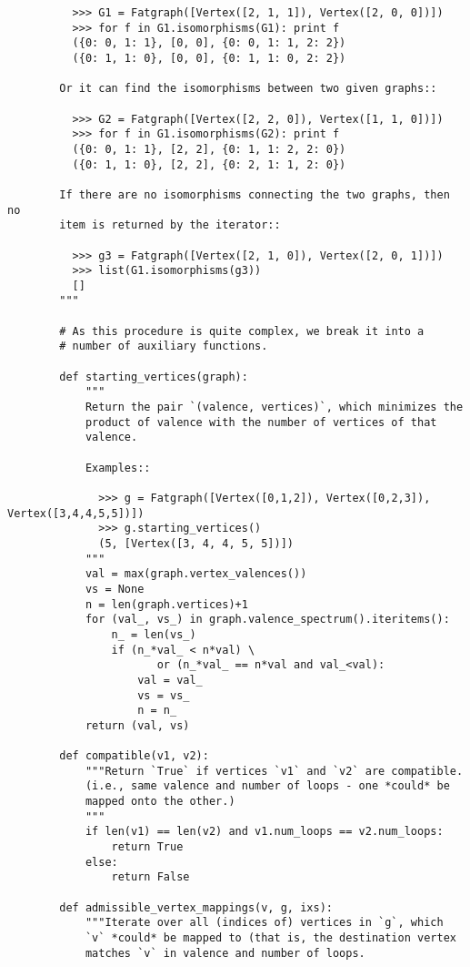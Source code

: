 \begin{lstlisting}
          >>> G1 = Fatgraph([Vertex([2, 1, 1]), Vertex([2, 0, 0])])
          >>> for f in G1.isomorphisms(G1): print f
          ({0: 0, 1: 1}, [0, 0], {0: 0, 1: 1, 2: 2})
          ({0: 1, 1: 0}, [0, 0], {0: 1, 1: 0, 2: 2})

        Or it can find the isomorphisms between two given graphs::

          >>> G2 = Fatgraph([Vertex([2, 2, 0]), Vertex([1, 1, 0])])
          >>> for f in G1.isomorphisms(G2): print f
          ({0: 0, 1: 1}, [2, 2], {0: 1, 1: 2, 2: 0})
          ({0: 1, 1: 0}, [2, 2], {0: 2, 1: 1, 2: 0})

        If there are no isomorphisms connecting the two graphs, then no
        item is returned by the iterator::

          >>> g3 = Fatgraph([Vertex([2, 1, 0]), Vertex([2, 0, 1])])
          >>> list(G1.isomorphisms(g3))
          []
        """
        
        # As this procedure is quite complex, we break it into a
        # number of auxiliary functions.
        
        def starting_vertices(graph):
            """
            Return the pair `(valence, vertices)`, which minimizes the
            product of valence with the number of vertices of that
            valence.

            Examples::

              >>> g = Fatgraph([Vertex([0,1,2]), Vertex([0,2,3]), Vertex([3,4,4,5,5])])
              >>> g.starting_vertices()
              (5, [Vertex([3, 4, 4, 5, 5])])
            """
            val = max(graph.vertex_valences())
            vs = None
            n = len(graph.vertices)+1
            for (val_, vs_) in graph.valence_spectrum().iteritems():
                n_ = len(vs_)
                if (n_*val_ < n*val) \
                       or (n_*val_ == n*val and val_<val):
                    val = val_
                    vs = vs_
                    n = n_
            return (val, vs)

        def compatible(v1, v2):
            """Return `True` if vertices `v1` and `v2` are compatible.
            (i.e., same valence and number of loops - one *could* be
            mapped onto the other.)
            """
            if len(v1) == len(v2) and v1.num_loops == v2.num_loops:
                return True
            else:
                return False
                
        def admissible_vertex_mappings(v, g, ixs):
            """Iterate over all (indices of) vertices in `g`, which
            `v` *could* be mapped to (that is, the destination vertex
            matches `v` in valence and number of loops.


\end{lstlisting}
